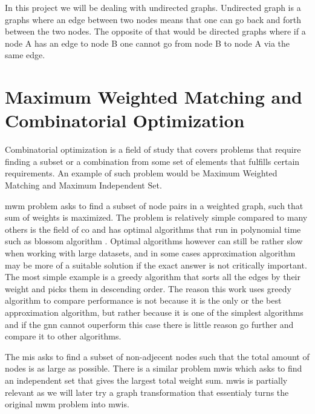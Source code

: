 In this project we will be dealing with undirected graphs. Undirected graph is a graphs where an edge between two nodes means that one can go back and forth between the two nodes. The opposite of that would be directed graphs where if a node A has an edge to node B one cannot go from node B to node A via the same edge.

\section{Maximum Weighted Matching and Combinatorial Optimization}

Combinatorial optimization is a field of study that covers problems that require finding a subset or a combination from some set of elements that fulfills certain requirements. An example of such problem would be Maximum Weighted Matching and Maximum Independent Set. 

\gls{mwm} problem asks to find a subset of node pairs in a weighted graph, such that sum of weights is maximized. The problem is relatively simple compared to many others is the field of \gls{co} and has optimal algorithms that run in polynomial time such as blossom algorithm \cite{blossom}. Optimal algorithms however can still be rather slow when working with large datasets, and in some cases approximation algorithm may be more of a suitable solution if the exact answer is not critically important. The most simple example is a greedy algorithm that sorts all the edges by their weight and picks them in descending order. The reason this work uses greedy algorithm to compare performance is not because it is the only or the best approximation algorithm, but rather because it is one of the simplest algorithms and if the \gls{gnn} cannot ouperform this case there is little reason go further and compare it to other algorithms.

The \gls{mis} asks to find a subset of non-adjecent nodes such that the total amount of nodes is as large as possible. There is a similar problem \gls{mwis} which asks to find an independent set that gives the largest total weight sum. \gls{mwis} is partially relevant as we will later try a graph transformation that essentialy turns the original \gls{mwm} problem into \gls{mwis}.


